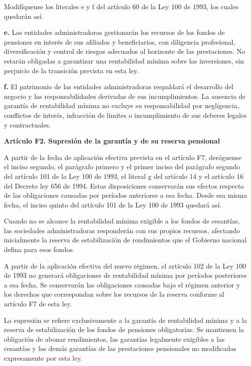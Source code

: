 Modifíquense los literales e y f del artículo 60 de la Ley 100 de 1993, los cuales quedarán así.

\textbf{e.} Las entidades administradoras gestionarán los recursos de los fondos de pensiones en interés de sus afiliados y beneficiarios, con diligencia profesional, diversificación y control de riesgos adecuados al horizonte de las prestaciones. No estarán obligadas a garantizar una rentabilidad mínima sobre las inversiones, sin perjuicio de la transición prevista en esta ley.

\textbf{f.} El patrimonio de las entidades administradoras respaldará el desarrollo del negocio y las responsabilidades derivadas de sus incumplimientos. La ausencia de garantía de rentabilidad mínima no excluye su responsabilidad por negligencia, conflictos de interés, infracción de límites o incumplimiento de sus deberes legales y contractuales.

\textbf{Artículo F2. Supresión de la garantía y de su reserva pensional}\par\nobreak

A partir de la fecha de aplicación efectiva prevista en el artículo F7, deróguense el inciso segundo, el parágrafo primero y el primer inciso del parágrafo segundo del artículo 101 de la Ley 100 de 1993, el literal g del artículo 14 y el artículo 16 del Decreto ley 656 de 1994. Estas disposiciones conservarán sus efectos respecto de las obligaciones causadas por períodos anteriores a esa fecha. Desde esa misma fecha, el inciso quinto del artículo 101 de la Ley 100 de 1993 quedará así.

Cuando no se alcance la rentabilidad mínima exigible a los fondos de cesantías, las sociedades administradoras responderán con sus propios recursos, afectando inicialmente la reserva de estabilización de rendimientos que el Gobierno nacional defina para esos fondos.

A partir de la aplicación efectiva del nuevo régimen, el artículo 102 de la Ley 100 de 1993 no generará obligaciones de rentabilidad mínima por períodos posteriores a esa fecha. Se conservarán las obligaciones causadas bajo el régimen anterior y los derechos que correspondan sobre los recursos de la reserva conforme al artículo F7 de esta ley.

La supresión se refiere exclusivamente a la garantía de rentabilidad mínima y a la reserva de estabilización de los fondos de pensiones obligatorias. Se mantienen la obligación de abonar rendimientos, las garantías legalmente exigibles a las cesantías y las demás garantías de las prestaciones pensionales no modificadas expresamente por esta ley.

